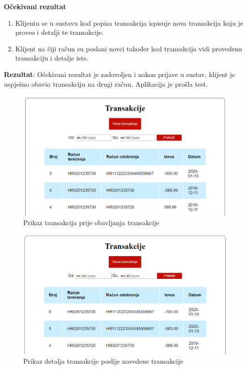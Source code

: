 	\textbf{Očekivani rezultat}
	
	\begin{enumerate}
		\item Klijentu se u sustavu kod popisa transakcija ispisuje nova transakcija koju je proveo i detalji te transakcije.
		\item Klijent na čiji račun su poslani novci također kod transakcija vidi provedenu transakciju i detalje iste.
	\end{enumerate}
	
	\textbf{Rezultat}: Očekivani rezultat je zadovoljen i nakon prijave u sustav, klijent je uspješno obavio transakciju na drugi račun. Aplikacija je prošla test.
	
	\begin{figure}[H]
		\includegraphics[scale=0.7]{slike/transakcijeprije.PNG}
		\centering
		\caption{Prikaz transakcija prije obavljanja transakcije}
		\label{fig:transprije}
	\end{figure}
	\begin{figure}[H]
		\includegraphics[scale=0.7]{slike/transakcijeposlije.PNG}
		\centering
		\caption{Prikaz detalja transakcije poslije navedene transakcije}
		\label{fig:transposlije}
	\end{figure}


